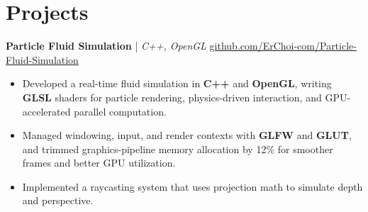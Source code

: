 \documentclass[11pt]{article}
\begin{document}

\section*{Projects}

\textbf{Particle Fluid Simulation} | \textit{C++, OpenGL} \hfill \href{https://github.com/ErChoi-com/Particle-Fluid-Simulation}{github.com/ErChoi-com/Particle-Fluid-Simulation} \\
\begin{itemize}
  \item Developed a real-time fluid simulation in \textbf{C++} and \textbf{OpenGL}, writing \textbf{GLSL} shaders for particle rendering, physics-driven interaction, and GPU-accelerated parallel computation.
  \item Managed windowing, input, and render contexts with \textbf{GLFW} and \textbf{GLUT}, and trimmed graphics-pipeline memory allocation by 12\% for smoother frames and better GPU utilization.
  \item Implemented a raycasting system that uses projection math to simulate depth and perspective.
\end{itemize}

\end{document}
